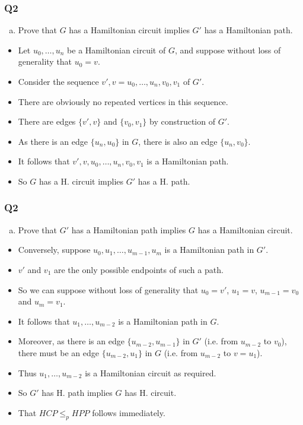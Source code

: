 \documentclass[handout]{beamer}
\begin{document}
\begin{frame}
\frametitle{Q2}
\begin{enumerate}[b)]
\item Prove that $G$ has a Hamiltonian circuit implies $G'$ has a Hamiltonian path.
\end{enumerate}
\begin{itemize}
\item Let $u_0,\ldots,u_n$ be a Hamiltonian circuit of $G$, and suppose without loss of generality that $u_0 = v$. 
\vspace{0.2cm}
\item Consider the sequence $v',v=u_0,\ldots,u_n,v_0,v_1$ of $G'$. 
\vspace{0.2cm}
\item There are obviously no repeated vertices in this sequence. 
\vspace{0.2cm}
\item There are edges $\{v',v\}$ and $\{v_0,v_1\}$ by construction of $G'$.
\vspace{0.2cm}
\item As there is an edge $\{u_n,u_0\}$ in $G$, there is also an edge $\{u_n, v_0\}$. 
\vspace{0.2cm}
\item It follows that $v',v,u_0,\ldots,u_n,v_0,v_1$ is a Hamiltonian path.
\vspace{0.2cm}
\item So $G$ has a H. circuit implies $G'$ has a H. path.
\end{itemize} 
\end{frame}

\begin{frame}
\frametitle{Q2}
\begin{enumerate}[c)]
\item Prove that $G'$ has a Hamiltonian path implies $G$ has a Hamiltonian circuit.
\end{enumerate}
\begin{itemize}
\item Conversely, suppose $u_0,u_1,\ldots,u_{m-1},u_m$ is a Hamiltonian path in $G'$. 
\item $v'$ and $v_1$ are the only possible endpoints of such a path.
\item So we can suppose without loss of generality that $u_0 = v'$, $u_1 = v$, $u_{m-1} = v_0$ and $u_m = v_1$. 
\item It follows that $u_1,\ldots,u_{m-2}$ is a Hamiltonian path in $G$. 
\item Moreover, as there is an edge $\{u_{m-2},u_{m-1}\}$ in $G'$ (i.e. from $u_{m-2}$ to $v_0$), there must be an edge $\{u_{m-2},u_1\}$ in $G$ (i.e. from $u_{m-2}$ to $v=u_1$). 
\item Thus $u_1,\ldots,u_{m-2}$ is a Hamiltonian circuit as required. 
\item So $G'$ has H. path implies $G$ has H. circuit.
\vspace{0.5cm}
\item That $HCP\leq_p HPP$ follows immediately.
\end{itemize} 
\end{frame}
\end{document}
